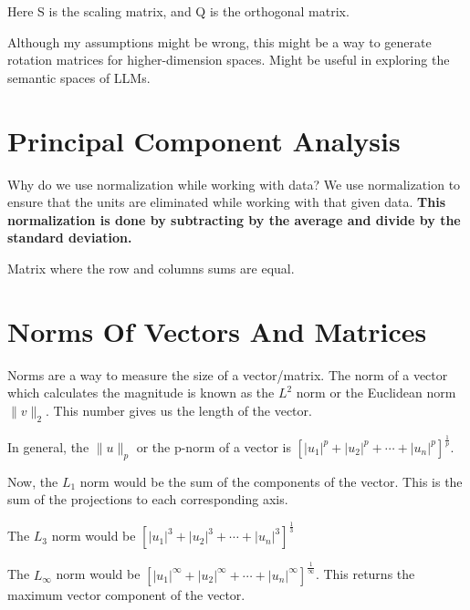 \documentclass[twoside]{report}
\begin{document}
Here S is the scaling matrix, and Q is the orthogonal matrix.

\begin{note}
	Although my assumptions might be wrong, this might be a way to generate rotation matrices for higher-dimension spaces. Might be useful in exploring the semantic spaces of LLMs.
\end{note}
\section{Principal Component Analysis}
Why do we use normalization while working with data? We use normalization to ensure that the units are eliminated while working with that given data.
\textbf{This normalization is done by subtracting by the average and divide by the standard deviation.}
\begin{definition}
	Matrix where the row and columns sums are equal.
\end{definition}

\section{Norms Of Vectors And Matrices}
Norms are a way to measure the size of a vector/matrix. The norm of a vector which calculates the magnitude is known as the $L^2$ norm or the Euclidean norm $\|v\|_2$. This number gives us the length of the vector.

In general, the $\|u\|_p$ or the p-norm of a vector is $[|u_1|^p + |u_2|^p + \cdots + |u_n|^p]^{\frac{1}{p}}$.

Now, the $L_1$ norm would be the sum of the components of the vector. This is the sum of the projections to each corresponding axis.

The $L_3$ norm would be $[|u_1|^3 + |u_2|^3 + \cdots + |u_n|^3]^{\frac{1}{3}}$

The $L_\infty$ norm would be $[|u_1|^\infty + |u_2|^\infty + \cdots + |u_n|^\infty]^{\frac{1}{\infty}}$. This returns the maximum vector component of the vector.
\end{document}
